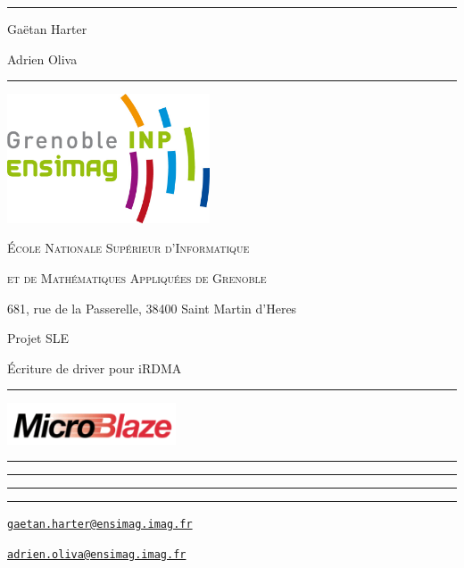 \documentclass[a4paper,10pt]{article}
\begin{document}
\rule{5cm}{1pt}

Gaëtan Harter

Adrien Oliva

\rule{5cm}{1pt}

\begin{flushright}
\vspace{5mm}\includegraphics[width=6cm]{../img/ensimag.png}

\footnotesize{\textsc{\'Ecole Nationale Sup\'erieur d'Informatique}}

\footnotesize{\textsc{ et de Math\'ematiques Appliqu\'ees de Grenoble}}

\footnotesize{681, rue de la Passerelle, 38400 Saint Martin d'Heres}
\end{flushright}

\vspace{2cm}

\begin{center}

\begin{LARGE}
Projet SLE
\end{LARGE}

\begin{LARGE}
Écriture de driver pour iRDMA
\end{LARGE}

\vspace{5mm}

\begin{Large}
\TITLE
\end{Large}

\rule{6cm}{2pt}
\end{center}

\vspace{25mm}

\begin{flushright}

\includegraphics[width=5cm]{../img/microblaze.png}

\rule{11cm}{0.5pt}

\vspace{-3mm}
\rule{7cm}{0.5pt}

\vspace{-3mm}
\rule{5cm}{0.5pt}

\vspace{-3mm}
\rule{4cm}{0.5pt}

\vspace{5mm}
\href{mailto:gaetan.harter@ensimag.imag.fr}
{\texttt{gaetan.harter@ensimag.imag.fr}}

\href{mailto:adrien.oliva@ensimag.imag.fr}
{\texttt{adrien.oliva@ensimag.imag.fr}}
\end{flushright}

\vfill
\eject

\tableofcontents

\vfill
\eject
\end{document}
